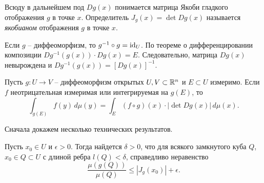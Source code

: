 Всюду в дальнейшем под $Dg(x)$ понимается матрица Якоби гладкого отображения $g$ в точке $x$. 
Определитель $J_g(x) = \det Dg(x)$ называется \textit{якобианом} отображения $g$ в точке $x$.

\begin{note}
    Если $g$ -- диффеоморфизм, то $g^{-1} \circ g = \mathrm{id}_U$. По теореме о дифференцировании композиции $Dg^{-1}(g(x)) \cdot Dg(x) = E$. 
    Следовательно, матрица $Dg(x)$ невырождена и $Dg^{-1}(g(x)) = [ Dg(x) ]^{-1}$.
\end{note}

\begin{theorem}
    Пусть $g : U \to V$ -- диффеоморфизм открытых $U, V \subset \mathbb{R}^n$ и $E \subset U$ измеримо. 
    Если $f$ неотрицательная измеримая или интегрируемая на $g(E)$, то 
    \[ \int_{g(E)} f(y) \, d\mu(y) = \int_{E} (f \circ g)(x) \cdot |\det Dg(x)| \, d\mu(x). \]
\end{theorem}

Сначала докажем несколько технических результатов. 

\begin{lemma}
    Пусть $x_0 \in U$ и $\epsilon > 0$. Тогда найдется $\delta > 0$, что для всякого замкнутого куба $Q$, $x_0 \in Q \subset U$ с длиной ребра $l(Q) < \delta$, справедливо неравенство 
    \[ \frac{\mu(g(Q))}{\mu(Q)} \leq |J_g(x_0)| + \epsilon. \] 
\end{lemma}

